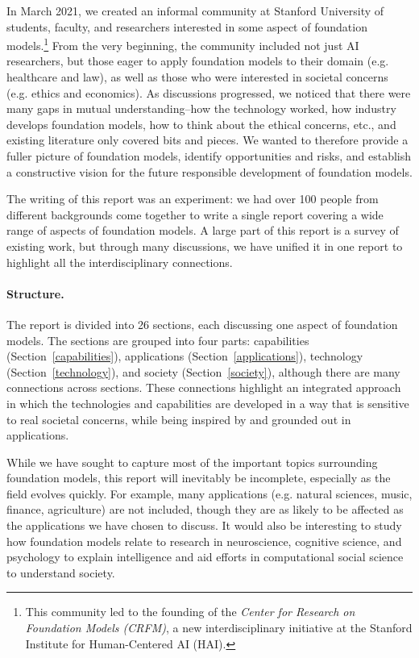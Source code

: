 In March 2021, we created an informal community at Stanford University of students, faculty, and researchers interested in some aspect of foundation models.\footnote{This community led to the founding of the \emph{Center for Research on Foundation Models (CRFM)}, a new interdisciplinary initiative at the Stanford Institute for Human-Centered AI (HAI).} From the very beginning, the community included not just AI researchers, but those eager to apply foundation models to their domain (e.g. {}healthcare and law), as well as those who were interested in societal concerns (e.g. {}ethics and economics). As discussions progressed, we noticed that there were many gaps in mutual understanding--how the technology worked, how industry develops foundation models, how to think about the ethical concerns, etc., and existing literature only covered bits and pieces. We wanted to therefore provide a fuller picture of foundation models, identify opportunities and risks, and establish a constructive vision for the future responsible development of foundation models.

The writing of this report was an experiment: we had over 100 people from different backgrounds come together to write a single report covering a wide range of aspects of foundation models. A large part of this report is a survey of existing work, but through many discussions, we have unified it in one report to highlight all the interdisciplinary connections.

\paragraph{Structure.}

The report is divided into 26 sections, each discussing one aspect of foundation models. The sections are grouped into four parts: capabilities (Section~\ref{capabilities}),
applications (Section~\ref{applications}),
technology (Section~\ref{technology}),
and society (Section~\ref{society}),
although there are many connections across sections. These connections highlight an integrated approach in which the technologies and capabilities are developed in a way that is sensitive to real societal concerns, while being inspired by and grounded out in applications.

While we have sought to capture most of the important topics surrounding foundation models, this report will inevitably be incomplete, especially as the field evolves quickly. For example, many applications (e.g. natural sciences, music, finance, agriculture) are not included, though they are as likely to be affected as the applications we have chosen to discuss. It would also be interesting to study how foundation models relate to research in neuroscience, cognitive science, and psychology to explain intelligence and aid efforts in computational social science to understand society.

